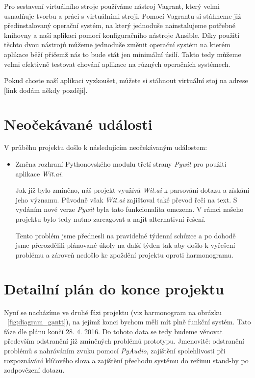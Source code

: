 \documentclass[12pt,a4paper]{article}
\begin{document}
Pro sestavení virtuálního stroje používáme nástroj Vagrant, který velmi usnadňuje tvorbu a práci s virtuálními stroji. Pomocí Vagrantu si stáhneme již předinstalovaný operační systém, na který jednoduše nainstalujeme potřebné knihovny a naší aplikaci pomocí konfiguračního nástroje Ansible. Díky použití těchto dvou nástrojů můžeme jednoduše změnit operační systém na kterém aplikace běží přičemž nás to bude stát jen minimální úsilí. Takto tedy můžeme velmi efektivně testovat chování aplikace na různých operačních systémech.

Pokud chcete naší aplikaci vyzkoušet, můžete si stáhnout virtuální stoj na adrese [link dodám někdy později].

\section{Neočekávané události}
V průběhu projektu došlo k následujícím neočekávaným událostem:
\begin{itemize}
	\item Změna rozhraní Pythonovského modulu třetí strany \textit{Pywit} pro použití aplikace \textit{Wit.ai}.
	
	Jak již bylo zmíněno, náš projekt využívá \textit{Wit.ai} k parsování dotazu a získání jeho významu. Původně však \textit{Wit.ai} zajišťoval také převod řeči na text. S vydáním nové verze \textit{Pywit} byla tato funkcionalita omezena. V rámci našeho projektu bylo tedy nutno zareagovat a najít alternativní řešení. 
	
	Tento problém jsme přednesli na pravidelné týdenní schůzce a po dohodě jsme přerozdělili plánované úkoly na další týden tak aby došlo k vyřešení problému a zároveň nedošlo ke zpoždění projektu oproti harmonogramu.
	

\end{itemize}

\section{Detailní plán do konce projektu}
Nyní se nacházíme ve druhé fázi projektu (viz harmonogram na obrázku ~\ref{fig:diagram_gantt}), na jejímž konci bychom měli mít plně funkční systém. Tato fáze dle plánu končí 28. 4. 2016. Do tohoto data se tedy budeme věnovat především odstranění již zmíněných problémů prototypu. Jmenovitě: odstranění problémů s nahráváním zvuku pomocí \textit{PyAudio}, zajištění spolehlivosti při rozpoznávání klíčového slova a zajištění přechodu systému do režimu stand-by po zodpovězení dotazu.
\end{document}

